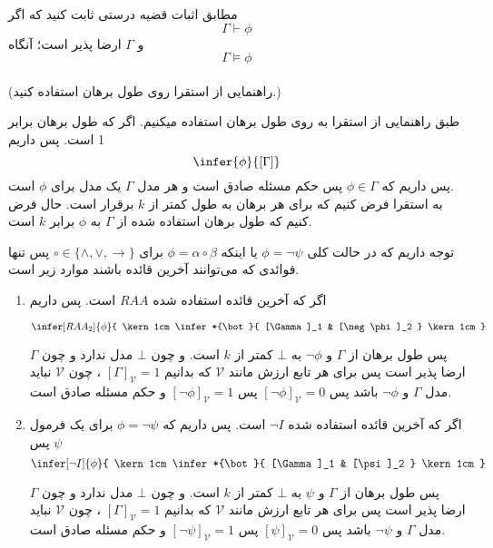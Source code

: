 	
	مطابق اثبات قضیه درستی ثابت کنید که اگر 
	$$\Gamma \vdash \phi$$
	و $\Gamma$ ارضا پذیر است؛ آنگاه
	$$\Gamma \vDash \phi$$\\
	(راهنمایی از استقرا روی طول برهان استفاده کنید.)
	
	\quad\vspace{0.5 cm}
	\begin {ans}
		طبق راهنمایی از استقرا به روی طول برهان استفاده میکنیم. 
		اگر که طول برهان برابر 1 است. پس داریم 
		$$
			\infer{\phi}{[\Gamma]}
		$$
		پس داریم که
		$\phi \in \Gamma$
	پس حکم مسئله صادق است و هر مدل
	 	$\Gamma$
	  یک مدل برای
	  	$\phi$
	    است.\\
		به استقرا فرض کنیم که برای هر برهان به طول کمتر از 
		$k$
		برقرار است. حال فرض کنیم که طول برهان استفاده شده از 
		$\Gamma$
		به 
		$\phi$
		برابر 
		$k$
		است. 
		
		
		توجه داریم که در حالت کلی
		$\phi = \neg \psi$
		یا اینکه 
		$\phi = \alpha \circ \beta$
		برای
		$\circ \in \{\wedge, \vee, \to\}$
		پس تنها قوائدی که می‌توانند آخرین قائده باشند موارد زیر است.
		
		\quad\vspace {0.5 cm}
		\begin {enumerate}
			\item اگر که آخرین قائده استفاده شده
			$RAA$ است. پس داریم 
			
			$$
				\infer[RAA_2]{\phi}{
					\kern 1cm	
					\infer*{\bot}{
						[\Gamma]_1
						&
						[\neg \phi]_2
					}
					\kern 1cm
				}
			$$
			
			پس طول برهان از 
			$\Gamma$ و $\neg \phi$
			به $\bot$ کمتر از $k$ است.
			و چون $\bot$ مدل ندارد و چون $\Gamma$ ارضا پذیر است پس برای هر تابع ارزش مانند $\mathcal {V}$ که بدانیم
			$[\Gamma]_\mathcal{V} = 1$ 
			، چون $\mathcal {V}$ نباید مدل $\Gamma$ و $\neg \phi$ باشد پس 
			$[\neg \phi]_\mathcal{V} = 0$
			پس 
			$[\neg \phi]_\mathcal{V} = 1$
			و حکم مسئله صادق است.
			
			
			
		\item 
		 اگر که آخرین قائده استفاده شده
		$\neg I$ است. پس داریم 
		 که $\phi = \neg \psi$ 
		 برای یک فرمول
		  $\psi$
		   پس
		$$
		\infer[\neg I]{\phi}{
			\kern 1cm	
			\infer*{\bot}{
				[\Gamma]_1
				&
				[\psi]_2
			}
			\kern 1cm
		}
		$$
		
		پس طول برهان از 
		$\Gamma$ و $\psi$
		به $\bot$ کمتر از $k$ است.
		و چون $\bot$ مدل ندارد و چون $\Gamma$ ارضا پذیر است پس برای هر تابع ارزش مانند $\mathcal {V}$ که بدانیم
		$[\Gamma]_\mathcal{V} = 1$ 
		، چون $\mathcal {V}$ نباید مدل $\Gamma$ و $\neg \psi$ باشد پس 
		$[\psi]_\mathcal{V} = 0$
		پس 
		$[\neg \psi]_\mathcal{V} = 1$
		و حکم مسئله صادق است.
		

\end{enumerate}
\end{ans}
